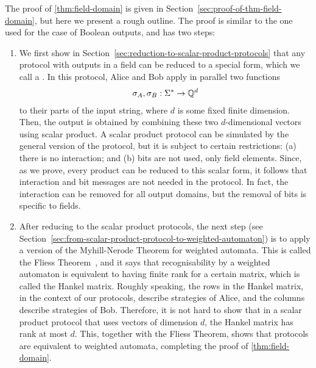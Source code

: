   The proof of \cref{thm:field-domain} is given in Section~\ref{sec:proof-of-thm-field-domain}, but here we present a rough outline.  The proof is similar to the one used for the case of Boolean outputs, and has  two steps:

\begin{enumerate}
  \item We first show in Section~\ref{sec:reduction-to-scalar-product-protocols} that any protocol with outputs in a field can be reduced to a special  form, which we call a \emph{}. In this protocol, Alice and Bob apply in parallel two functions 
\begin{align*}
\sigma_A, \sigma_B : \Sigma^* \to {\mathbb Q}^d
\end{align*}
to their parts of the input string, where $d$ is some fixed finite dimension. Then, the output is obtained by combining these two  $d$-dimensional vectors using scalar product. A scalar product protocol can be simulated by the general version of the protocol, but it is subject to certain restrictions: (a) there is no interaction; and (b) bits are not used, only  field elements. Since, as we prove, every product can be reduced to this scalar form, it follows that interaction and bit messages are not needed in the protocol. In fact, the interaction can be removed for all output domains, but the removal of bits is specific to fields. 
\item After reducing to the scalar product protocols, the next step (see Section~\ref{sec:from-scalar-product-protocol-to-weighted-automaton}) is to apply a version of the Myhill-Nerode Theorem for weighted automata. This is called the  Fliess Theorem~\cite{fliess1974}, and it says that recognisability by a weighted automaton is equivalent to having finite rank for a certain matrix, which is called the Hankel matrix. Roughly speaking, the rows in the Hankel matrix, in the context of our protocols, describe strategies of Alice, and the columns describe strategies of Bob. Therefore, it is not hard to show that in a scalar product protocol that uses vectors of dimension $d$,  the Hankel matrix has rank at most $d$. This, together with the Fliess Theorem, shows that protocols are equivalent to weighted automata, completing the proof of \cref{thm:field-domain}.
\end{enumerate}

 




